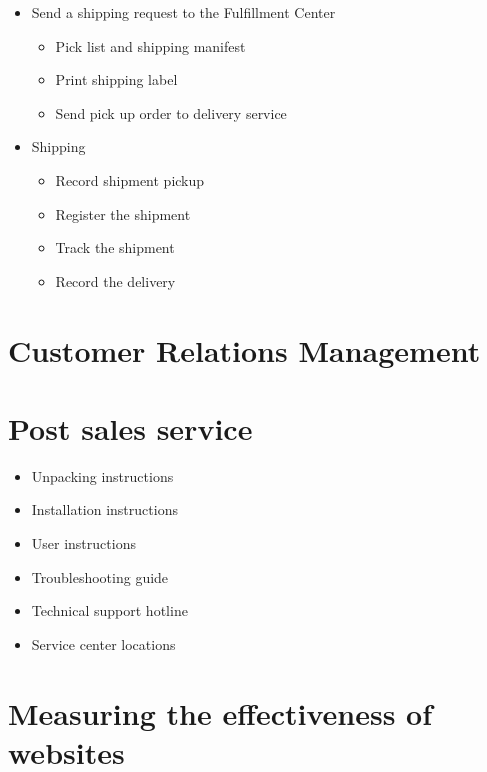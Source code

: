 \documentclass[]{book}
\providecommand{\tightlist}{%
  \setlength{\itemsep}{0pt}\setlength{\parskip}{0pt}}
\begin{document}
\begin{itemize}
\tightlist
\item
  Send a shipping request to the Fulfillment Center

  \begin{itemize}
  \tightlist
  \item
    Pick list and shipping manifest
  \item
    Print shipping label
  \item
    Send pick up order to delivery service
  \end{itemize}
\item
  Shipping

  \begin{itemize}
  \tightlist
  \item
    Record shipment pickup
  \item
    Register the shipment
  \item
    Track the shipment
  \item
    Record the delivery
  \end{itemize}
\end{itemize}

\hypertarget{customer-relations-management}{%
\section{Customer Relations Management}\label{customer-relations-management}}

\hypertarget{post-sales-service}{%
\section{Post sales service}\label{post-sales-service}}

\begin{itemize}
\tightlist
\item
  Unpacking instructions
\item
  Installation instructions
\item
  User instructions
\item
  Troubleshooting guide
\item
  Technical support hotline
\item
  Service center locations
\end{itemize}

\hypertarget{measuring-the-effectiveness-of-websites}{%
\section{Measuring the effectiveness of websites}\label{measuring-the-effectiveness-of-websites}}
\end{document}
